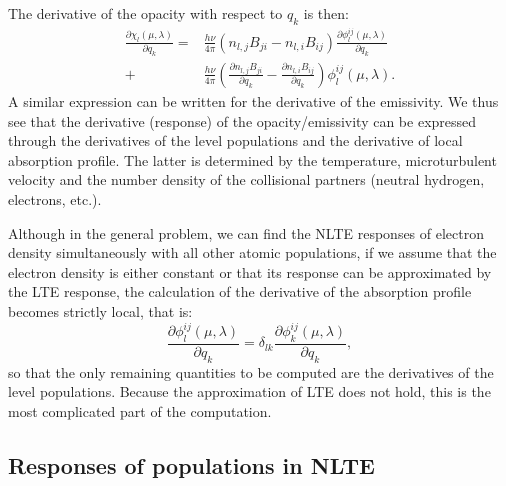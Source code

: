 \documentclass[referee]{aa}
\begin{document}
The derivative of the opacity with respect to $q_k$ is then:
\begin{align}
  \frac{\partial \chi_l(\mu,\lambda)}{\partial q_k} = & \frac{h\nu}{4\pi}(n_{l,j} B_{ji} - n_{l,i}B_{ij}) \frac{\partial\phi^{ij}_l(\mu,\lambda)}{\partial q_k} \nonumber \\
 + & \frac{h\nu}{4\pi}(\frac{\partial n_{l,j} B_{ji}}{\partial q_k} - \frac{\partial n_{l,i}B_{ij}}{\partial q_k}) \phi^{ij}_l(\mu,\lambda).
 \label{chi_derivative}
\end{align}
A similar expression can be written for the derivative of the emissivity. We thus see that the derivative (response) of the opacity/emissivity can be expressed through the derivatives of the level populations and the derivative of local absorption profile. The latter is determined by the temperature, microturbulent velocity and the number density of the collisional partners (neutral hydrogen, electrons, etc.). 

Although in the general problem, we can find the NLTE responses of electron density simultaneously with all other atomic populations, if we assume that the electron density is either constant or that its response can be approximated by the LTE response, the calculation of the derivative of the absorption profile becomes strictly local, that is:
\begin{equation}
 \frac{\partial\phi^{ij}_l(\mu,\lambda)}{\partial q_k} = \delta_{lk} \frac{\partial\phi^{ij}_k(\mu,\lambda)}{\partial q_k},
\end{equation}
so that the only remaining quantities to be computed are the derivatives of the level populations. Because the approximation of LTE does not hold, this is the most complicated part of the computation.

\subsection{Responses of populations in NLTE}
\label{nlte_lvls}
\end{document}
